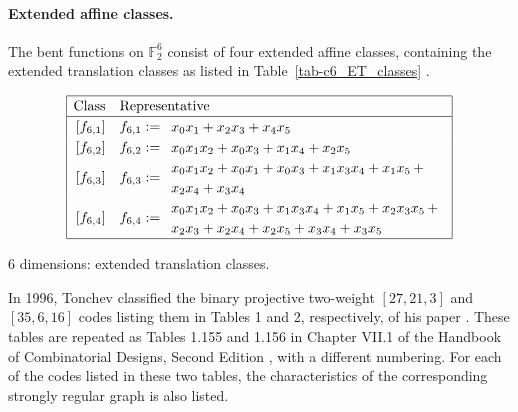 \documentclass[12pt,a4paper]{article}
\newcommand{\mb}[1]{\mathbb{#1}}
\newcommand{\F}{\mb{F}}
\begin{document}
\paragraph*{Extended affine classes.}
%
The bent functions on $\F_2^6$ consist of four
extended affine classes, containing the extended translation classes as listed in Table~\ref{tab-c6_ET_classes}
\cite[p. 303]{Rot76} \cite[Section 7.2]{Tok15bent}.
\begin{table}[!bhpt] %
\small{
\begin{align*}
\def\arraystretch{1.2}
\begin{array}{|cl|}
\hline
\text{Class} &
\text{Representative}
\\
\hline
\,[f_{6,1}] & f_{6,1} :=
\begin{array}{l}
x_{0} x_{1} + x_{2} x_{3} + x_{4} x_{5}
\end{array}
\\
\,[f_{6,2}] & f_{6,2} :=
\begin{array}{l}
x_{0} x_{1} x_{2} + x_{0} x_{3} + x_{1} x_{4} + x_{2} x_{5}
\end{array}
\\
\,[f_{6,3}] & f_{6,3} :=
\begin{array}{l}
x_{0} x_{1} x_{2} + x_{0} x_{1} + x_{0} x_{3} + x_{1} x_{3} x_{4} + x_{1} x_{5}\, +
\\
x_{2} x_{4} + x_{3} x_{4}
\end{array}
\\
\,[f_{6,4}] & f_{6,4} :=
\begin{array}{l}
x_{0} x_{1} x_{2} + x_{0} x_{3} + x_{1} x_{3} x_{4} + x_{1} x_{5} + x_{2} x_{3} x_{5}\, +
\\
x_{2} x_{3} + x_{2} x_{4} + x_{2} x_{5} + x_{3} x_{4} + x_{3} x_{5}
\end{array}
\\
\hline
\end{array}
\end{align*}
}
\caption{6 dimensions: extended translation classes.}
\label{tab-c6_ET_classes}
\end{table}

In 1996, Tonchev classified the binary projective two-weight $[27,21,3]$ and $[35,6,16]$ codes
listing them in Tables 1 and 2, respectively, of his paper \cite{Ton96uniformly}.
These tables are repeated as Tables 1.155 and 1.156 in Chapter VII.1 of the Handbook of
Combinatorial Designs, Second Edition \cite{Ton07codes},
with a different numbering.
For each of the codes listed in these two tables, the characteristics of the corresponding
strongly regular graph is also listed.
\end{document}
